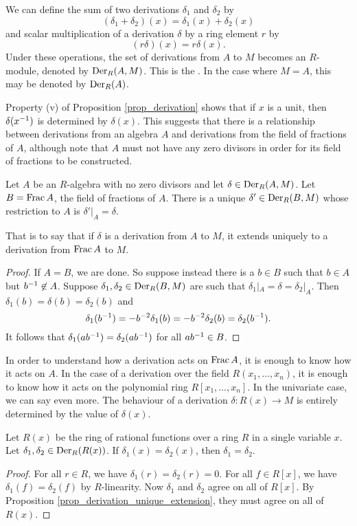 We can define the sum of two derivations $\delta_1$ and $\delta_2$ by
  \[ (\delta_1 + \delta_2)(x) = \delta_1(x) + \delta_2(x) \]
and scalar multiplication of a derivation $\delta$ by a ring element $r$ by
  \[ (r\delta)(x) = r\delta(x). \]
Under these operations, the set of derivations from $A$ to $M$ becomes an $R$-module,
denoted by $\operatorname{Der}_R(A,M)$.
This is the .
In the case where $M = A$, this may be denoted by $\operatorname{Der}_R(A)$.

Property (v) of Proposition \ref{prop_derivation} shows that if $x$ is a unit,
then $\delta(x^{-1})$ is determined by $\delta(x)$.
This suggests that there is a relationship between derivations from an algebra $A$
and derivations from the field of fractions of $A$,
although note that $A$ must not have any zero divisors in order for its field of fractions to be constructed.

\begin{proposition}
  \label{prop_derivation_unique_extension}
  Let $A$ be an $R$-algebra with no zero divisors and let $\delta \in \operatorname{Der}_R(A,M)$.
  Let $B = \operatorname{Frac} A$, the field of fractions of $A$.
  There is a unique $\delta' \in \operatorname{Der}_R(B, M)$ whose restriction to $A$ is $\delta'|_A = \delta$.
\end{proposition}
That is to say that if $\delta$ is a derivation from $A$ to $M$,
it extends uniquely to a derivation from $\operatorname{Frac} A$ to $M$.
\begin{proof}
  If $A = B$, we are done.
  So suppose instead there is a $b \in B$ such that $b\in A$ but $b^{-1} \not \in A$.
  Suppose $\delta_1, \delta_2 \in \operatorname{Der}_R(B, M)$ are such that $\delta_1|_{A} = \delta = \delta_2|_{A}$.
  Then $\delta_1(b) = \delta(b) = \delta_2(b)$ and
    \[ \delta_1(b^{-1}) = -b^{-2}\delta_1(b) = -b^{-2}\delta_2(b) = \delta_2(b^{-1}). \]
  It follows that $\delta_1(ab^{-1}) = \delta_2(ab^{-1})$ for all $ab^{-1} \in B$.
\end{proof}

In order to understand how a derivation acts on $\operatorname{Frac} A$, it is enough to know how it acts on $A$.
In the case of a derivation over the field $R(x_1, \ldots, x_n)$,
it is enough to know how it acts on the polynomial ring $R[x_1, \ldots, x_n]$.
In the univariate case, we can say even more.
The behaviour of a derivation $\delta: R(x) \to M$ is entirely determined by the value of $\delta(x)$.

\begin{proposition}
  \label{prop_derivation_unique_x}
  Let $R(x)$ be the ring of rational functions over a ring $R$ in a single variable $x$.
  Let $\delta_1, \delta_2 \in \operatorname{Der}_R(R(x))$.
  If $\delta_1(x) = \delta_2(x)$, then $\delta_1 = \delta_2$.
\end{proposition}
\begin{proof}
  For all $r \in R$, we have $\delta_1(r) = \delta_2(r) = 0$.
  For all $f \in R[x]$, we have $\delta_1(f) = \delta_2(f)$ by $R$-linearity.
  Now $\delta_1$ and $\delta_2$ agree on all of $R[x]$.
  By Proposition \ref{prop_derivation_unique_extension}, they must agree on all of $R(x)$.
\end{proof}

